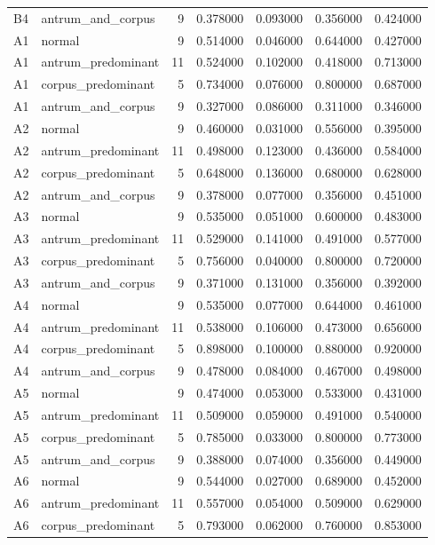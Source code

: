 \begin{table}
\begin{tabular}{llrrrrr}
B4 & antrum\_and\_corpus & 9 & 0.378000 & 0.093000 & 0.356000 & 0.424000 \\
A1 & normal & 9 & 0.514000 & 0.046000 & 0.644000 & 0.427000 \\
A1 & antrum\_predominant & 11 & 0.524000 & 0.102000 & 0.418000 & 0.713000 \\
A1 & corpus\_predominant & 5 & 0.734000 & 0.076000 & 0.800000 & 0.687000 \\
A1 & antrum\_and\_corpus & 9 & 0.327000 & 0.086000 & 0.311000 & 0.346000 \\
A2 & normal & 9 & 0.460000 & 0.031000 & 0.556000 & 0.395000 \\
A2 & antrum\_predominant & 11 & 0.498000 & 0.123000 & 0.436000 & 0.584000 \\
A2 & corpus\_predominant & 5 & 0.648000 & 0.136000 & 0.680000 & 0.628000 \\
A2 & antrum\_and\_corpus & 9 & 0.378000 & 0.077000 & 0.356000 & 0.451000 \\
A3 & normal & 9 & 0.535000 & 0.051000 & 0.600000 & 0.483000 \\
A3 & antrum\_predominant & 11 & 0.529000 & 0.141000 & 0.491000 & 0.577000 \\
A3 & corpus\_predominant & 5 & 0.756000 & 0.040000 & 0.800000 & 0.720000 \\
A3 & antrum\_and\_corpus & 9 & 0.371000 & 0.131000 & 0.356000 & 0.392000 \\
A4 & normal & 9 & 0.535000 & 0.077000 & 0.644000 & 0.461000 \\
A4 & antrum\_predominant & 11 & 0.538000 & 0.106000 & 0.473000 & 0.656000 \\
A4 & corpus\_predominant & 5 & 0.898000 & 0.100000 & 0.880000 & 0.920000 \\
A4 & antrum\_and\_corpus & 9 & 0.478000 & 0.084000 & 0.467000 & 0.498000 \\
A5 & normal & 9 & 0.474000 & 0.053000 & 0.533000 & 0.431000 \\
A5 & antrum\_predominant & 11 & 0.509000 & 0.059000 & 0.491000 & 0.540000 \\
A5 & corpus\_predominant & 5 & 0.785000 & 0.033000 & 0.800000 & 0.773000 \\
A5 & antrum\_and\_corpus & 9 & 0.388000 & 0.074000 & 0.356000 & 0.449000 \\
A6 & normal & 9 & 0.544000 & 0.027000 & 0.689000 & 0.452000 \\
A6 & antrum\_predominant & 11 & 0.557000 & 0.054000 & 0.509000 & 0.629000 \\
A6 & corpus\_predominant & 5 & 0.793000 & 0.062000 & 0.760000 & 0.853000 \\

\end{tabular}
\end{table}
